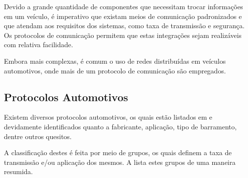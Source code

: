 Devido a grande quantidade de componentes que necessitam trocar informações em um veículo, é imperativo que existam meios de comunicação padronizados e que atendam aos requisitos dos sistemas, como taxa de transmissão e segurança. Os protocolos de comunicação permitem que estas integrações sejam realizáveis com relativa facilidade.

Embora mais complexas, é comum o uso de redes distribuídas em veículos automotivos, onde mais de um protocolo de comunicação são empregados.


\subsection{Protocolos Automotivos}

Existem diversos protocolos automotivos, os quais estão listados em  e devidamente identificados quanto a fabricante, aplicação, tipo de barramento, dentre outros quesitos.

A classificação destes é feita por meio de grupos, os quais definem a taxa de transmissão e/ou aplicação dos mesmos. A  lista estes grupos de uma maneira resumida.

